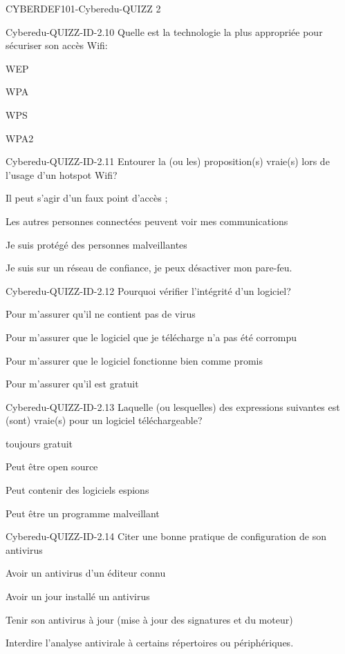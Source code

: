 \documentclass[12pt]{article}
\begin{document}
\begin{quiz}{CYBERDEF101-Cyberedu-QUIZZ 2}
\begin{multi}[multiple=true]{Cyberedu-QUIZZ-ID-2.10}
	Quelle est la technologie la plus appropri\'ee pour s\'ecuriser son acc\`es Wifi:
\item WEP
\item WPA
\item WPS
\item* WPA2
\end{multi}

\begin{multi}[multiple=true]{Cyberedu-QUIZZ-ID-2.11}
	Entourer la (ou les) proposition(s) vraie(s) lors de l'usage d'un hotspot Wifi?
\item* Il peut s'agir d'un faux point d'acc\`es ;
\item* Les autres personnes connect\'ees peuvent voir mes communications
\item Je suis prot\'eg\'e des personnes malveillantes
\item Je suis sur un r\'eseau de confiance, je peux d\'esactiver mon pare-feu.
\end{multi}

\begin{multi}[multiple=true]{Cyberedu-QUIZZ-ID-2.12}
	Pourquoi v\'erifier l'int\'egrit\'e d'un logiciel?
\item Pour m'assurer qu'il ne contient pas de virus
\item* Pour m'assurer que le logiciel que je t\'el\'echarge n'a pas \'et\'e corrompu
\item Pour m'assurer que le logiciel fonctionne bien comme promis
\item Pour m'assurer qu'il est gratuit
\end{multi}

\begin{multi}[multiple=true]{Cyberedu-QUIZZ-ID-2.13}
	Laquelle (ou lesquelles) des expressions suivantes est (sont) vraie(s) pour un logiciel t\'el\'echargeable?
\item toujours gratuit
\item* Peut \^etre  open source
\item* Peut contenir des logiciels espions
\item* Peut \^etre un programme malveillant
\end{multi}

\begin{multi}[multiple=true]{Cyberedu-QUIZZ-ID-2.14}
	Citer une bonne pratique de configuration de son antivirus
\item Avoir un antivirus d'un \'editeur connu
\item Avoir un jour install\'e un antivirus
\item* Tenir son antivirus \`{a} jour (mise \`{a} jour des signatures et du moteur)
\item Interdire l'analyse antivirale \`{a} certains r\'epertoires ou p\'eriph\'eriques.
\end{multi}


\end{quiz}
\end{document}

